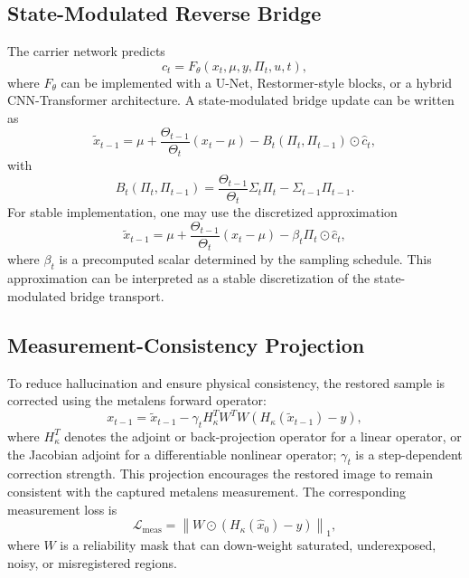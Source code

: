 \documentclass[journal]{IEEEtran}
\newcommand{\hk}{H_{\kappa}}
\begin{document}
\subsection{State-Modulated Reverse Bridge}
The carrier network predicts
\begin{equation}
    \hat{c}_t=F_{\theta}(x_t,\mu,y,\Pi_t,u,t),
    \label{eq:carrier_pred}
\end{equation}
where $F_{\theta}$ can be implemented with a U-Net, Restormer-style blocks, or a hybrid CNN-Transformer architecture. A state-modulated bridge update can be written as
\begin{equation}
    \tilde{x}_{t-1}=\mu+\frac{\Theta_{t-1}}{\Theta_t}(x_t-\mu)-B_t(\Pi_t,\Pi_{t-1})\odot\hat{c}_t,
    \label{eq:reverse_update}
\end{equation}
with
\begin{equation}
    B_t(\Pi_t,\Pi_{t-1})=\frac{\Theta_{t-1}}{\Theta_t}\Sigma_t\Pi_t-\Sigma_{t-1}\Pi_{t-1}.
    \label{eq:b_t}
\end{equation}
For stable implementation, one may use the discretized approximation
\begin{equation}
    \tilde{x}_{t-1}=\mu+\frac{\Theta_{t-1}}{\Theta_t}(x_t-\mu)-\beta_t\Pi_t\odot\hat{c}_t,
    \label{eq:reverse_update_approx}
\end{equation}
where $\beta_t$ is a precomputed scalar determined by the sampling schedule. This approximation can be interpreted as a stable discretization of the state-modulated bridge transport.

\subsection{Measurement-Consistency Projection}
To reduce hallucination and ensure physical consistency, the restored sample is corrected using the metalens forward operator:
\begin{equation}
    x_{t-1}=\tilde{x}_{t-1}-\gamma_t\hk^T W^T W\left(\hk(\tilde{x}_{t-1})-y\right),
    \label{eq:projection}
\end{equation}
where $\hk^T$ denotes the adjoint or back-projection operator for a linear operator, or the Jacobian adjoint for a differentiable nonlinear operator; $\gamma_t$ is a step-dependent correction strength. This projection encourages the restored image to remain consistent with the captured metalens measurement. The corresponding measurement loss is
\begin{equation}
    \mathcal{L}_{\mathrm{meas}}=\left\|W\odot\left(\hk(\hat{x}_0)-y\right)\right\|_1,
    \label{eq:loss_meas}
\end{equation}
where $W$ is a reliability mask that can down-weight saturated, underexposed, noisy, or misregistered regions.
\end{document}
